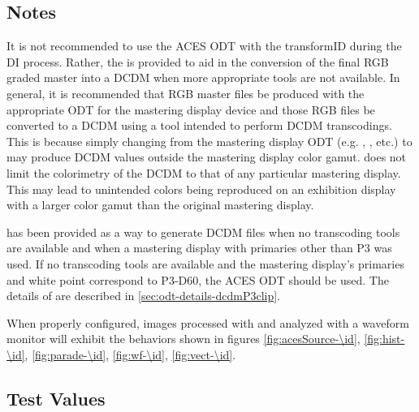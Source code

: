 \subsection{Notes}
\label{subsec:notes-\id}

It is not recommended to use the ACES ODT with the transformID \transformID{\id} during the DI process.  Rather, the \transformID{\id} is provided to aid in the conversion of the final RGB graded master into a DCDM when more appropriate tools are not available.  In general, it is recommended that RGB master files be produced with the appropriate ODT for the mastering display device and those RGB files be converted to a DCDM using a tool intended to perform DCDM transcodings. This is because simply changing from the mastering display ODT (e.g. , , etc.) to \transformID{\id} may produce DCDM values outside the mastering display color gamut.  \transformID{\id} does not limit the colorimetry of the DCDM to that of any particular mastering display.  This may lead to unintended colors being reproduced on an exhibition display with a larger color gamut than the original mastering display. 

\transformID{\id} has been provided as a way to generate DCDM files when no transcoding tools are available and when a mastering display with primaries other than P3 was used.  If no transcoding tools are available and the mastering display's primaries and white point correspond to P3-D60, the ACES ODT  should be used. The details of  are described in \ref{sec:odt-details-dcdmP3clip}.

When properly configured, images processed with \transformID{\id} and analyzed with a waveform monitor will exhibit the behaviors shown in figures \ref{fig:acesSource-\id}, \ref{fig:hist-\id}, \ref{fig:parade-\id}, \ref{fig:wf-\id}, \ref{fig:vect-\id}.


\subsection{Test Values}
\label{subsec:testValues-\id}

\testValuesSubSec{}


